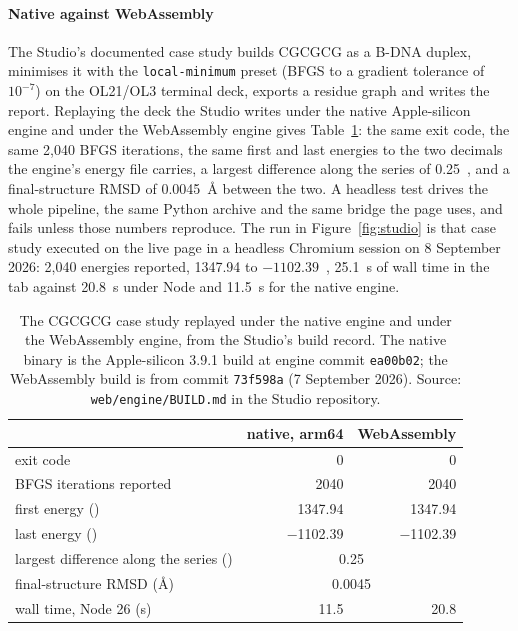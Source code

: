 \paragraph{Native against WebAssembly}
The Studio's documented case study builds CGCGCG as a B-DNA duplex, minimises
it with the \texttt{local-minimum} preset (BFGS to a gradient tolerance of
$10^{-7}$) on the OL21/OL3 terminal deck, exports a residue graph and writes
the report. Replaying the deck the Studio writes under the native Apple-silicon
engine and under the WebAssembly engine gives Table~\ref{tab:studio}: the same
exit code, the same 2,040 BFGS iterations, the same first and last energies to
the two decimals the engine's energy file carries, a largest difference along
the series of 0.25~\kcal{}, and a final-structure RMSD of 0.0045~\AA{} between
the two. A headless test drives the whole pipeline, the same Python archive and
the same bridge the page uses, and fails unless those numbers reproduce. The
run in Figure~\ref{fig:studio} is that case study executed on the live page in
a headless Chromium session on 8 September 2026: 2,040 energies reported,
1347.94 to $-1102.39$~\kcal{}, 25.1~s of wall time in the tab against 20.8~s
under Node and 11.5~s for the native engine.

\begin{table}[t]
\centering
\small
\caption{The CGCGCG case study replayed under the native engine and under the
WebAssembly engine, from the Studio's build record. The native binary is the
Apple-silicon 3.9.1 build at engine commit \texttt{ea00b02}; the WebAssembly
build is from commit \texttt{73f598a} (7 September 2026). Source:
\texttt{web/engine/BUILD.md} in the Studio repository.}
\label{tab:studio}
\begin{tabular}{@{}lrr@{}}
\toprule
 & native, arm64 & WebAssembly \\
\midrule
exit code & 0 & 0 \\
BFGS iterations reported & 2040 & 2040 \\
first energy (\kcal{}) & 1347.94 & 1347.94 \\
last energy (\kcal{}) & $-$1102.39 & $-$1102.39 \\
largest difference along the series (\kcal{}) & \multicolumn{2}{c}{0.25} \\
final-structure RMSD (\AA{}) & \multicolumn{2}{c}{0.0045} \\
wall time, Node 26 (s) & 11.5 & 20.8 \\
\bottomrule
\end{tabular}
\end{table}

